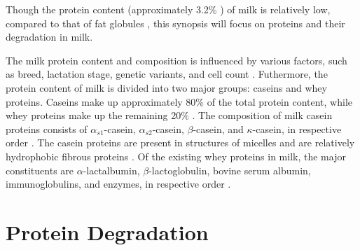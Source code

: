 \vspace{0.5em}
Though the protein content (approximately 3.2\% \cite*{s09_milk_secretion_and_ejection}) of milk is relatively low, compared to that of fat globules \cite*{b01_milk_biochemistry}, this synopsis will focus on proteins and their degradation in milk.

\vspace{0.5em}
The milk protein content and composition is influenced by various factors, such as breed, lactation stage, genetic variants, and cell count \cite*{s04_protein_fraction_in_milk}. Futhermore, the protein content of milk is divided into two major groups: caseins and whey proteins. Caseins make up approximately 80\% of the total protein content, while whey proteins make up the remaining 20\% \cite*{s04_protein_fraction_in_milk}. The composition of milk casein proteins consists of $\alpha_{s1}$-casein, $\alpha_{s2}$-casein, $\beta$-casein, and $\kappa$-casein, in respective order \cite*{s04_protein_fraction_in_milk}. The casein proteins are present in structures of micelles and are relatively hydrophobic fibrous proteins \cite*{b01_milk_biochemistry}. Of the existing whey proteins in milk, the major constituents are $\alpha$-lactalbumin, $\beta$-lactoglobulin, bovine serum albumin, immunoglobulins, and enzymes, in respective order \cite*{s04_protein_fraction_in_milk}.




%


\section{Protein Degradation}


